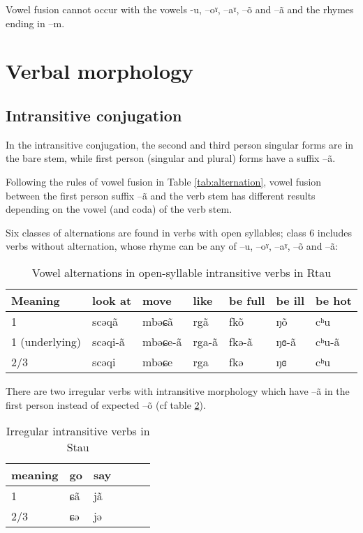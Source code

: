 \documentclass[oneside,a4paper,11pt]{article}
\newcommand{\ipa}[1]{{\phon #1}} %
\begin{document}
Vowel fusion cannot occur with the vowels -\ipa{u}, --\ipa{oˠ}, --\ipa{aˠ}, --\ipa{õ} and --\ipa{ã} and the rhymes ending in \ipa{--m}.
 
\section{Verbal morphology}


\subsection{Intransitive conjugation}
In the intransitive conjugation, the second and third person singular forms are in the bare stem, while first person (singular and plural) forms have a suffix \ipa{--ã}.

Following the rules of  vowel fusion in Table \ref{tab:alternation}, vowel fusion between the first person suffix \ipa{--ã} and the verb stem has different results depending on the vowel (and coda) of the verb stem. 
 
Six classes of alternations are found in verbs with open syllables; class 6 includes verbs without alternation, whose rhyme can be any of --\ipa{u}, --\ipa{oˠ}, --\ipa{aˠ}, --\ipa{õ} and --\ipa{ã}:
\begin{table}[H]
\caption{Vowel alternations in open-syllable intransitive verbs in Rtau} \label{tab:open.intr} \centering
\begin{tabular}{llll|ll|l}
\toprule
Meaning &	look at   &  	move   &  	like&  	be full     &  	 	be ill      &  	be hot       \\  
\midrule
1&	\ipa{scəqã} & 	\ipa{mbəɕã} & \ipa{rgã} &	\ipa{fkõ} & 	  	\ipa{ŋõ} & 	   	\ipa{cʰu}   \\ 
1 (underlying)&	\ipa{scəqi-ã} & 	\ipa{mbəɕe-ã} & \ipa{rga-ã} &	\ipa{fkə-ã} & 	  	\ipa{ŋɞ-ã} & 	   	\ipa{cʰu-ã}   \\ 
2/3&	\ipa{scəqi} & 	\ipa{mbəɕe} & \ipa{rga} & 	\ipa{fkə} & 	  	\ipa{ŋɞ} & 	 	\ipa{cʰu}  \\ 
\bottomrule
\end{tabular}
\end{table}


There are two irregular verbs with intransitive morphology  which have \ipa{--ã} in the first person instead of expected \ipa{--õ} (cf table \ref{tab:irr.intr}). 

\begin{table}[H]
\caption{Irregular intransitive verbs in Stau} \label{tab:irr.intr} \centering
\begin{tabular}{llllll}
\toprule
meaning &	go     & say &\\  
\midrule
1&	\ipa{ɕã}  	 &\ipa{jã} &\\ 
2/3&	\ipa{ɕə} & 	\ipa{jə} &\\ 
\bottomrule
\end{tabular}
\end{table}
\end{document}
